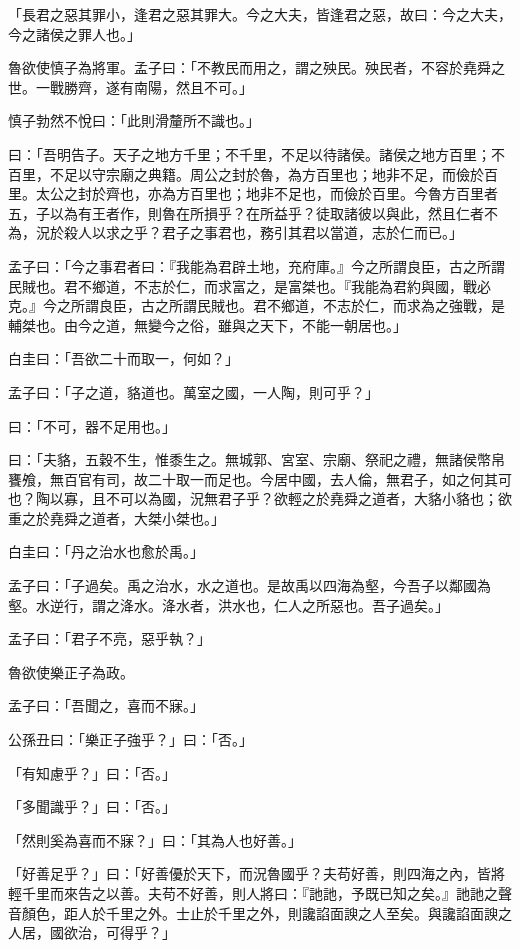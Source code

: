 \begin{pinyinscope}
「長君之惡其罪小，逢君之惡其罪大。今之大夫，皆逢君之惡，故曰：今之大夫，今之諸侯之罪人也。」

魯欲使慎子為將軍。孟子曰：「不教民而用之，謂之殃民。殃民者，不容於堯舜之世。一戰勝齊，遂有南陽，然且不可。」

慎子勃然不悅曰：「此則滑釐所不識也。」

曰：「吾明告子。天子之地方千里；不千里，不足以待諸侯。諸侯之地方百里；不百里，不足以守宗廟之典籍。周公之封於魯，為方百里也；地非不足，而儉於百里。太公之封於齊也，亦為方百里也；地非不足也，而儉於百里。今魯方百里者五，子以為有王者作，則魯在所損乎？在所益乎？徒取諸彼以與此，然且仁者不為，況於殺人以求之乎？君子之事君也，務引其君以當道，志於仁而已。」

孟子曰：「今之事君者曰：『我能為君辟土地，充府庫。』今之所謂良臣，古之所謂民賊也。君不鄉道，不志於仁，而求富之，是富桀也。『我能為君約與國，戰必克。』今之所謂良臣，古之所謂民賊也。君不鄉道，不志於仁，而求為之強戰，是輔桀也。由今之道，無變今之俗，雖與之天下，不能一朝居也。」

白圭曰：「吾欲二十而取一，何如？」

孟子曰：「子之道，貉道也。萬室之國，一人陶，則可乎？」

曰：「不可，器不足用也。」

曰：「夫貉，五穀不生，惟黍生之。無城郭、宮室、宗廟、祭祀之禮，無諸侯幣帛饔飧，無百官有司，故二十取一而足也。今居中國，去人倫，無君子，如之何其可也？陶以寡，且不可以為國，況無君子乎？欲輕之於堯舜之道者，大貉小貉也；欲重之於堯舜之道者，大桀小桀也。」

白圭曰：「丹之治水也愈於禹。」

孟子曰：「子過矣。禹之治水，水之道也。是故禹以四海為壑，今吾子以鄰國為壑。水逆行，謂之洚水。洚水者，洪水也，仁人之所惡也。吾子過矣。」

孟子曰：「君子不亮，惡乎執？」

魯欲使樂正子為政。

孟子曰：「吾聞之，喜而不寐。」

公孫丑曰：「樂正子強乎？」曰：「否。」

「有知慮乎？」曰：「否。」

「多聞識乎？」曰：「否。」

「然則奚為喜而不寐？」曰：「其為人也好善。」

「好善足乎？」曰：「好善優於天下，而況魯國乎？夫苟好善，則四海之內，皆將輕千里而來告之以善。夫苟不好善，則人將曰：『訑訑，予既已知之矣。』訑訑之聲音顏色，距人於千里之外。士止於千里之外，則讒諂面諛之人至矣。與讒諂面諛之人居，國欲治，可得乎？」


\end{pinyinscope}
